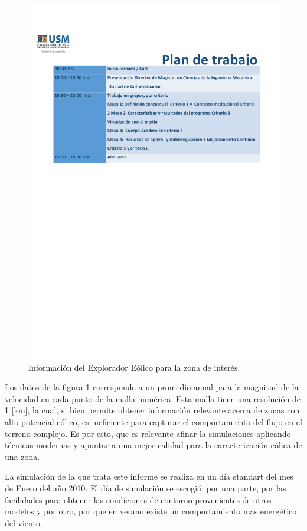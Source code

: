 \begin{figure}[H]
	\centering
	\includegraphics[width=0.9\linewidth,trim={5.4cm 2cm 15cm 5.5cm},clip]{Imagenes/explorador}
	\caption{Información del Explorador Eólico para la zona de interés.}
	\label{fig:explorador}
\end{figure}

Los datos de la figura \ref{fig:explorador} corresponde a un promedio anual para la magnitud de la velocidad en cada punto de la malla numérica. Esta malla tiene una resolución de 1 [km], la cual, si bien permite obtener información relevante acerca de zonas con alto potencial eólico, es ineficiente para capturar el comportamiento del flujo en el terreno complejo. Es por esto, que es relevante afinar la simulaciones aplicando técnicas modernas y apuntar a una mejor calidad para la caracterización eólica de una zona.

La simulación de la que trata este informe se realiza en un día standart del mes de Enero del año 2010. El día de simulación se escogió, por una parte, por las facilidades para obtener las condiciones de contorno provenientes de otros modelos y por otro, por que en verano existe un comportamiento mas energético del viento.

